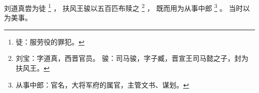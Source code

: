 
\switchcolumn*[\section{}]

刘道真尝为徒%
\footnote{%
    徒：服劳役的罪犯。
}%
，
扶风王骏以五百匹布赎之%
\footnote{%
    刘宝：字道真，西晋官员。
    骏：司马骏，字子臧，晋宣王司马懿之子，封为扶风王。
}%
，
既而用为从事中郎%
\footnote{%
    从事中郎：官名，大将军府的属官，主管文书、谋划。
}%
。
当时以为美事。

\switchcolumn



